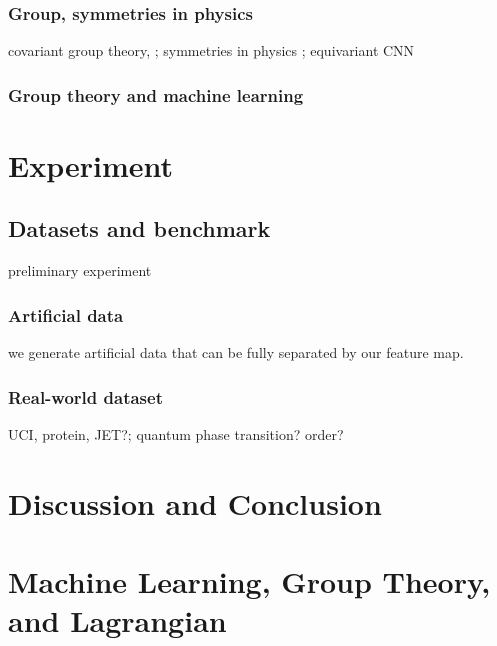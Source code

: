 \subsubsection{Group, symmetries in physics}
covariant 
\cite{glickCovariantQuantumKernels2021}
group theory, 
\cite{kondorGroupTheoreticalMethods2008};
symmetries in physics
\cite{bogatskiyLorentzGroupEquivariant2020};
equivariant CNN 
\cite{zhengSpeedingLearningQuantum2022}

\subsubsection{Group theory and machine learning}
\cite{kondorDiffusionKernelsGraphs2002}

\section{Experiment}\label{sec:experiments}

\subsection{Datasets and benchmark}
preliminary experiment
\subsubsection{Artificial data}
we generate artificial data that can be fully separated by our feature map.
\subsubsection{Real-world dataset}
UCI, protein, JET?; quantum phase transition? order?

\section{Discussion and Conclusion}\label{sec:discussion}

\printbibliography
\appendix

\section{Machine Learning, Group Theory, and Lagrangian}
